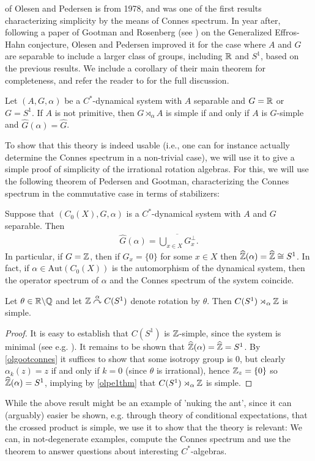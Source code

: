  of Olesen and Pedersen is from 1978, and was one of the first results characterizing simplicity by the means of Connes spectrum. In year after, following a paper of Gootman and Rosenberg (see \cite{gootman1979structure}) on the Generalized Effros-Hahn conjecture, Olesen and Pedersen improved it for the case where $A$ and $G$ are separable to include a larger class of groups, including $\mathbb{R}$ and $S^1$, based on the previous results. We include a corollary of their main theorem for completeness, and refer the reader to \cite{olesenpedersen2} for the full discussion.
\begin{corollary}
	Let $(A,G,\alpha)$ be a $C^*$-dynamical system with $A$ separable and $G = \mathbb{R}$ or $G=S^1$. If $A$ is not primitive, then $G \rtimes_\alpha A$ is simple if and only if $A$ is $G$-simple and $\hat G(\alpha) = \hat G$.
\end{corollary}

To show that this theory is indeed usable (i.e., one can for instance actually determine the Connes spectrum in a non-trivial case), we will use it to give a simple proof of simplicity of the irrational rotation algebras. For this, we will use the following theorem of Pedersen and Gootman, characterizing the Connes spectrum in the commutative case in terms of stabilizers:
\begin{theorem}
	Suppose that $(C_0(X),G,\alpha)$ is a $C^*$-dynamical system with $A$ and $G$ separable. Then
	\begin{align*}
		\hat G(\alpha) = \overline{\bigcup_{x \in X} G_x^\perp}.
	\end{align*}
	 In particular, if $G = \mathbb{Z}$, then if $G_x=\{0\}$ for some $x \in X$ then $\widehat{\mathbb{Z}}(\alpha) = \widehat{\mathbb{Z}} \cong S^1$. In fact, if $\alpha \in \mathrm{Aut}(C_0(X))$ is the automorphism of the dynamical system, then the operator spectrum of $\alpha$ and the Connes spectrum of the system coincide.
	\label{olgootconnes}
\end{theorem}
\begin{example}
	Let $\theta \in \mathbb{R} \backslash \mathbb{Q}$ and let $\mathbb{Z} \stackrel{\alpha}{\curvearrowright} C(S^1)$ denote rotation by $\theta$. Then $C(S^1) \rtimes_\alpha \mathbb{Z}$ is simple.
\end{example}
\begin{proof}
	It is easy to establish that $C(S^1)$ is $\mathbb{Z}$-simple, since the system is minimal (see e.g.  \cite[5.2]{glasner1976proximal}). It remains to be shown that $\widehat{\mathbb{Z}}(\alpha) = \widehat{\mathbb{Z}} = S^1$. By \cref{olgootconnes} it suffices to show that some isotropy group is $0$, but clearly $\alpha_k(z) = z$ if and only if $k = 0$ (since $\theta$ is irrational), hence $\mathbb{Z}_{z} = \{0\}$ so $\widehat{\mathbb{Z}} (\alpha) = S^1$, implying by \cref{olpe1thm} that $C(S^1) \rtimes_\alpha \mathbb{Z}$ is simple.
\end{proof}
While the above result might be an example of 'nuking the ant', since it can (arguably) easier be shown, e.g. through theory of conditional expectations, that the crossed product is simple, we use it to show that the theory is relevant: We can, in not-degenerate examples, compute the Connes spectrum and use the theorem to answer questions about interesting $C^*$-algebras.
